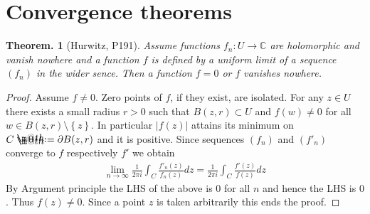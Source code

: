 \documentclass[openany, a4paper, oneside]{book}
\makeatletter
\newcommand*{\defeq}{\mathrel{\rlap{%
\raisebox{0.3ex}{$\m@th\cdot$}}%
\raisebox{-0.3ex}{$\m@th\cdot$}}%
=}
\theoremstyle{break}
\newtheorem{thm}{Theorem.}[section]
\theoremstyle{breakdefn}
\newcommand{\abs}[1]{\left|#1\right|}
\newcommand{\cbk}[1]{\left\{#1\right\}}
\newcommand{\bbC}{\mathbb{C}}
\makeatother
\begin{document}
\section{Convergence theorems}
\label{sec-6-1-9}

\begin{thm}[Hurwitz, \cite{LarsAhlfors1} P191]
 Assume functions $f_n \colon U \to \bbC$ are holomorphic and vanish nowhere
 and a function $f$ is defined by a uniform limit of a sequence $(f_n)$ in the wider sence.
 Then a function $f = 0$ or $f$ vanishes nowhere.
\end{thm}
\begin{proof}
 Assume $f \neq 0$.
 Zero points of $f$, if they exist, are isolated.
 For any $z \in U$ there exists a small radius $r>0$ such that $B (z, r) \subset U$ and $f (w) \neq 0$ for all $w \in B (z, r) \setminus \cbk{z}$.
 In particular $\abs{f (z)}$ attains its minimum on $C \defeq \partial B (z, r)$ and it is positive.
 Since sequences $(f_n)$ and $(f'_n)$ converge to $f$ respectively $f'$ we obtain
 \begin{align}
  \lim_{n \to \infty} \frac{1}{2 \pi i} \int_C \frac{f'_n (z)}{f_n (z)} dz
  =
  \frac{1}{2 \pi i} \int_C \frac{f' (z)}{f (z)} dz
 \end{align}
 By Argument principle the LHS of the above is $0$ for all $n$ and hence the LHS is $0$.
 Thus $f (z) \neq 0$.
 Since a point $z$ is taken arbitrarily this ends the proof.
\end{proof}
\end{document}
